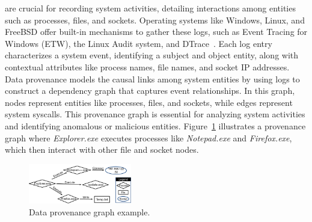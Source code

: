 


 \Logs are crucial for recording system activities, detailing interactions among entities such as processes, files, and sockets. Operating systems like Windows, Linux, and FreeBSD offer built-in mechanisms to gather these logs, such as Event Tracing for Windows (ETW)\cite{windowsaudit}, the Linux Audit system\cite{linuxaudit}, and DTrace~\cite{dtrace}. Each log entry characterizes a system event, identifying a subject and object entity, along with contextual attributes like process names, file names, and socket IP addresses. Data provenance models the causal links among system entities by using logs to construct a dependency graph that captures event relationships. In this graph, nodes represent entities like processes, files, and sockets, while edges represent system syscalls. This provenance graph is essential for analyzing system activities and identifying anomalous or malicious entities. Figure~\ref{provexp} illustrates a provenance graph where \textit{Explorer.exe} executes processes like \textit{Notepad.exe} and \textit{Firefox.exe}, which then interact with other file and socket nodes.
\begin{figure}[t!]
  \centering
  \includegraphics[width=0.4\textwidth]{fig/provexp.pdf}
  \caption{Data provenance graph example.}

  \label{provexp}
  \vspace{-2ex}
\end{figure}


